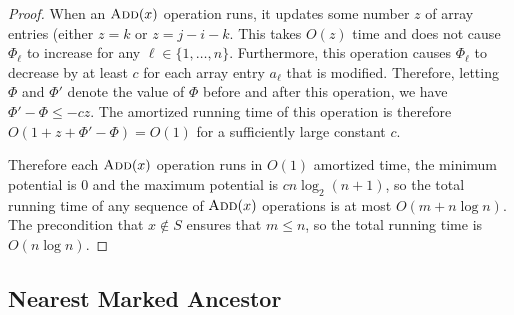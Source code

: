 \documentclass[kpfonts]{patmorin}
\let\le\leqslant
\begin{document}
\begin{proof}
    When an $\textsc{Add}(x)$ operation runs, it updates some number $z$ of array entries (either $z=k$ or $z=j-i-k$.   This takes $O(z)$ time and does not cause $\Phi_\ell$ to increase for any $\ell\in\{1,\ldots,n\}$.  Furthermore, this operation causes $\Phi_\ell$ to decrease by at least $c$ for each array entry $a_\ell$ that is modified. Therefore, letting $\Phi$ and $\Phi'$ denote the value of $\Phi$ before and after this operation, we have $\Phi'-\Phi \le -cz$.  The amortized running time of this operation is therefore $O(1+z+\Phi'-\Phi) = O(1)$ for a sufficiently large constant $c$.

    Therefore each $\textsc{Add}(x)$ operation runs in $O(1)$ amortized time, the minimum potential is $0$ and the maximum potential is $cn\log_2(n+1)$, so the total running time of any sequence of $\textsc{Add}(x)$ operations is at most $O(m + n\log n)$.  The precondition that $x\not\in S$ ensures that $m\le n$, so the total running time is $O(n\log n)$.
\end{proof}

\subsection{Nearest Marked Ancestor}
\end{document}
